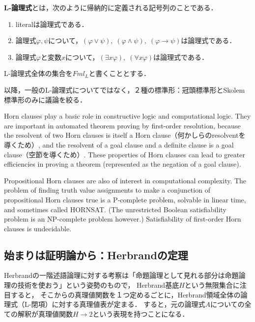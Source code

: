 \documentclass[uplatex, dvipdfmx]{jsreport}
\begin{document}
\begin{definition}[formula]
    \textbf{L-論理式}とは，次のように帰納的に定義される記号列のことである．
    \begin{enumerate}
        \item literalは論理式である．
        \item 論理式$\varphi,\psi$について，$(\varphi\lor\psi),\;(\varphi\land\psi),\;(\varphi\to\psi)$は論理式である．
        \item 論理式$\varphi$と変数$x$について，$(\exists x\varphi),\;(\forall x\varphi)$は論理式である．
    \end{enumerate}
    L-論理式全体の集合を$Fml_L$と書くこととする．
\end{definition}

以降，一般のL-論理式についてではなく，２種の標準形：冠頭標準形とSkolem標準形のみに議論を絞る．

\begin{application}
    Horn clauses play a basic role in constructive logic and computational logic. They are important in automated theorem proving by first-order resolution, because the resolvent of two Horn clauses is itself a Horn clause（何かしらのresolventを導くため）, and the resolvent of a goal clause and a definite clause is a goal clause（空節を導くため）. These properties of Horn clauses can lead to greater efficiencies in proving a theorem (represented as the negation of a goal clause).


    Propositional Horn clauses are also of interest in computational complexity. The problem of finding truth value assignments to make a conjunction of propositional Horn clauses true is a P-complete problem, solvable in linear time, and sometimes called HORNSAT. (The unrestricted Boolean satisfiability problem is an NP-complete problem however.) Satisfiability of first-order Horn clauses is undecidable.
\end{application}

\subsection{始まりは証明論から：Herbrandの定理}\label{subsection-Herbrand}

Herbrandの一階述語論理に対する考察は「命題論理として見れる部分は命題論理の技術を使おう」という姿勢のもので，
Herbrand基底$H$という無限集合に注目すると，
そこからの真理値関数を１つ定めるごとに，Herbrand領域全体の論理式（L-閉項）に対する真理値表が定まる．
すると，元の論理式$A$についての全ての解釈が真理値関数$H\to 2$という表現を持つことになる．
\end{document}
